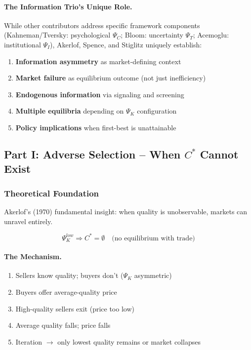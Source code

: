 \paragraph{The Information Trio's Unique Role.}
While other contributors address specific framework components (Kahneman/Tversky: 
psychological $\Psi_C$; Bloom: uncertainty $\Psi_T$; Acemoglu: institutional $\Psi_I$), 
Akerlof, Spence, and Stiglitz uniquely establish:
\begin{enumerate}
    \item \textbf{Information asymmetry} as market-defining context
    \item \textbf{Market failure} as equilibrium outcome (not just inefficiency)
    \item \textbf{Endogenous information} via signaling and screening
    \item \textbf{Multiple equilibria} depending on $\Psi_K$ configuration
    \item \textbf{Policy implications} when first-best is unattainable
\end{enumerate}

\subsection{Part I: Adverse Selection – When $C^*$ Cannot Exist}

\subsubsection{Theoretical Foundation}

Akerlof's (1970) fundamental insight: when quality is unobservable, 
markets can unravel entirely.

\begin{equation}
\boxed{
\Psi_K^{low} \Rightarrow C^* = \emptyset \quad \text{(no equilibrium with trade)}
}
\label{eq:akerlof-unraveling}
\end{equation}

\paragraph{The Mechanism.}
\begin{enumerate}
    \item Sellers know quality; buyers don't ($\Psi_K$ asymmetric)
    \item Buyers offer average-quality price
    \item High-quality sellers exit (price too low)
    \item Average quality falls; price falls
    \item Iteration $\to$ only lowest quality remains or market collapses
\end{enumerate}

